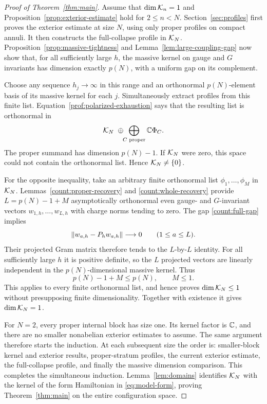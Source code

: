 \begin{proof}[Proof of Theorem~\ref{thm:main}]
Assume that \(\dim\mathcal K_n=1\) and Proposition~\ref{prop:exterior-estimate}
hold for \(2\le n<N\). Section~\ref{sec:profiles} first proves the
exterior estimate at size \(N\), using only proper profiles on compact
annuli. It then constructs the full-collapse profile in \(\mathcal K_N\).
Proposition~\ref{prop:massive-tightness} and
Lemma~\ref{lem:large-coupling-gap} now show that, for all sufficiently
large \(h\), the massive kernel on gauge and \(G\) invariants has
dimension exactly \(p(N)\), with a uniform gap on its complement.

Choose any sequence \(h_j\to\infty\) in this range and an orthonormal
\(p(N)\)-element basis of its massive kernel for each \(j\). Simultaneously
extract profiles from this finite list. Equation~\eqref{prof:polarized-exhaustion}
says that the resulting list is orthonormal in
\begin{equation}\label{count:limit-target}
              \mathcal K_N\ \oplus\!\!\bigoplus_{C\text{ proper}}\mathbb C\Phi_C.
\end{equation}
The proper summand has dimension \(p(N)-1\). If \(\mathcal K_N\) were zero,
this space could not contain the orthonormal list. Hence
\(\mathcal K_N\ne\{0\}\).

For the opposite inequality, take an arbitrary finite orthonormal list
\(\phi_1,\ldots,\phi_M\) in \(\mathcal K_N\). Lemmas~\ref{count:proper-recovery}
and \ref{count:whole-recovery} provide
\(L=p(N)-1+M\) asymptotically orthonormal even gauge- and
\(G\)-invariant vectors \(w_{1,h},\ldots,w_{L,h}\) with charge norms
tending to zero. The gap \eqref{count:full-gap} implies
\[
 \left\lVert w_{a,h}-P_hw_{a,h}\right\rVert\longrightarrow0
                  \qquad(1\le a\le L).
\]
Their projected Gram matrix therefore tends to the \(L\)-by-\(L\)
identity. For all sufficiently large \(h\) it is positive definite, so
the \(L\) projected vectors are linearly independent in the
\(p(N)\)-dimensional massive kernel. Thus
\[
                       p(N)-1+M\le p(N),\qquad M\le1.
\]
This applies to every finite orthonormal list, and hence proves
\(\dim\mathcal K_N\le1\) without presupposing finite dimensionality.
Together with existence it gives \(\dim\mathcal K_N=1\).

For \(N=2\), every proper internal block has size one. Its kernel factor
is \(\mathbb C\), and there are no smaller nonabelian exterior estimates to
assume. The same argument therefore starts the induction. At each
subsequent size the order is: smaller-block kernel and exterior results,
proper-stratum profiles, the current exterior estimate, the full-collapse
profile, and finally the massive dimension comparison. This completes
the simultaneous induction. Lemma~\ref{lem:domains} identifies
\(\mathcal K_N\) with the kernel of the form Hamiltonian in
\eqref{eq:model-form}, proving Theorem~\ref{thm:main} on the entire
configuration space.
\end{proof}
